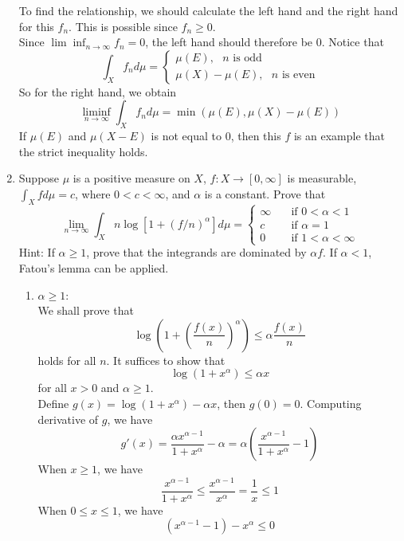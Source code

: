 \documentclass{article}
\begin{document}
\begin{enumerate}
 	To find the relationship, we should calculate the left hand and the right hand for this $f_n$. This is possible since $f_n\geq0$.\\
 	Since $\lim\inf_{n\to\infty}f_n=0$, the left hand should therefore be $0$. Notice that
 	\[
 		\int_Xf_nd\mu=\begin{cases}
 		\mu(E),\text{ $n$ is odd}\\
 		\mu(X)-\mu(E),\text{ $n$ is even}
 		\end{cases}
 	\]
 	So for the right hand, we obtain
 	\[
 	\liminf_{n\to\infty}\int_Xf_nd\mu=\min(\mu(E),\mu(X)-\mu(E))
 	\]
 	If $\mu(E)$ and $\mu(X-E)$ is not equal to $0$, then this $f$ is an example that the strict inequality holds.
 	\item \exercise Suppose $\mu$ is a positive measure on $X$, $f:X\to[0,\infty]$ is measurable, $\int_Xfd\mu=c$, where $0<c<\infty$, and $\alpha$ is a constant. Prove that
 	\[
 		\lim\limits_{n\to\infty}\int_{X}n\log[1+(f/n)^{\alpha}]d\mu=\begin{cases}
 		\infty&\quad\text{if }0<\alpha<1\\
 		c&\quad\text{if }\alpha=1\\
 		0&\quad\text{if }1<\alpha<\infty
 		\end{cases}
 	\]
 	Hint: If $\alpha\geq1$, prove that the integrands are dominated by $\alpha f$. If $\alpha<1$, Fatou's lemma can be applied.\\
 	\solution
 	\begin{enumerate}
 		\item $\alpha\geq{1}$:\\
 			We shall prove that
 			\[
 				\log\left(1+\left(\frac{f(x)}{n}\right)^{\alpha}\right)\leq\alpha\frac{f(x)}{n}
 			\]
 			holds for all $n$.
 			It suffices to show that
 			\[
 				\log(1+x^{\alpha})\leq\alpha{x}
 			\]
 			for all $x>0$ and $\alpha\geq{1}$.\\
 			Define $g(x)=\log(1+x^{\alpha})-\alpha{x}$, then $g(0)=0$. Computing derivative of $g$, we have
 			\[
 				g'(x)=\frac{\alpha{x^{\alpha-1}}}{1+x^{\alpha}}-\alpha=\alpha(\frac{x^{\alpha-1}}{1+x^{\alpha}}-1)
 			\]
 			When $x\geq{1}$, we have 
 			\begin{equation}
 				\frac{x^{\alpha-1}}{1+x^{\alpha}}\leq\frac{x^{\alpha-1}}{x^{\alpha}}=\frac{1}{x}\leq{1}
 			\end{equation}
 			When $0\leq{x}\leq{1}$, we have
 			\begin{equation}
	 			(x^{\alpha-1}-1)-x^{\alpha}\leq{0}
 			\end{equation}

\end{enumerate}
\end{enumerate}
\end{document}
